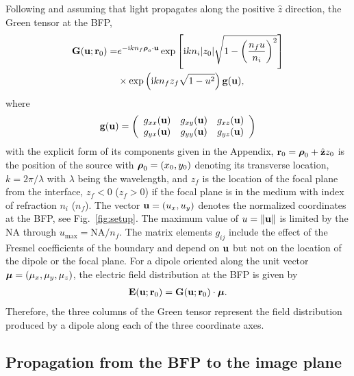 \documentclass[reprint,aps,pra,superscriptaddress,
amsmath,amssymb]{revtex4-1}
\begin{document}
Following \cite{lieb2004single,novotny2006principles} and assuming that 
light propagates along the positive $\hat z$ direction, the Green tensor 
at the BFP,
\begin{align} \label{eq:G0}
\textbf G (\textbf u; \textbf r_0) = &   e^{-\text{i} k n_f \boldsymbol \rho_o \cdot \textbf u } 
\exp \left[\text{i} k n_i |z_0| 
\sqrt{1 - \left(\frac{n_f u}{n_i} \right)^2 } \right]  \nonumber \\
& \times \exp \left(\text{i} k n_f z_f \sqrt{1 - u^2} \right) \textbf g (\textbf u) ,
\end{align}
where 
\begin{align}
\textbf g (\textbf u) =
\left(
\begin{array}{ccc}
g_{xx}  (\textbf u)& g_{xy}  (\textbf u)& g_{xz}  (\textbf u) \\
g_{yx}  (\textbf u)& g_{yy}  (\textbf u)& g_{yz} (\textbf u)
\end{array}
\right)
\end{align}
with the explicit form of  its components given in the Appendix, 
$\textbf r_0=\boldsymbol \rho_0 + \hat{\textbf z} z_0$ is the position of the source
with $\boldsymbol \rho_0 =(x_0,y_0)$  denoting its transverse location, 
$k=2 \pi/\lambda$ with $\lambda$ being the wavelength,
and 
$z_f$ is the location of the focal plane from the interface, $z_f<0$ 
($z_f>0$) if the focal plane is in the medium with index of refraction 
$n_i$ ($n_f$). The vector 
$\textbf u = (u_x, u_y)$ denotes the normalized coordinates at the BFP, 
see Fig.~\ref{fig:setup}. The maximum value of $u = \left\lVert\textbf u\right\rVert$ is 
limited by the NA through $u_\text{max} = \text{NA}/n_f$. 
The matrix elements $g_{ij}$ include the effect of the Fresnel coefficients 
of the boundary and depend on $\textbf u$ but not on the location of the dipole 
or the focal plane.  For a dipole oriented along the unit vector 
$\boldsymbol \mu = (\mu_x, \mu_y, \mu_z)$, the electric field distribution at the BFP 
is given by 
\begin{align}
\textbf E (\textbf u; \textbf r_0) = \textbf G (\textbf u; \textbf r_0) \cdot \boldsymbol \mu.
\end{align}
Therefore, the three columns of the Green tensor represent the field 
distribution produced by a dipole along each of the three coordinate axes. 


\subsection{Propagation from the BFP to the image plane}
\end{document}

